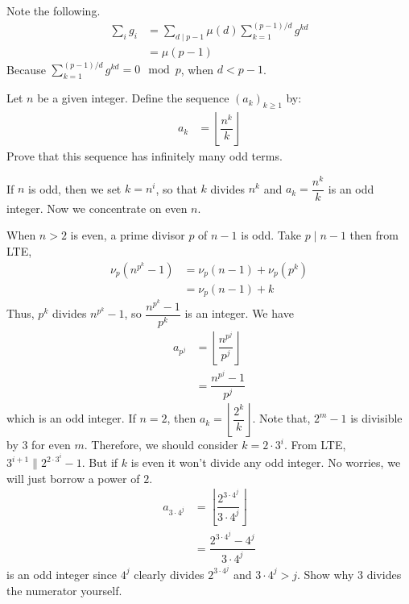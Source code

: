 \documentclass[problems.tex]{subfile}
\begin{document}
	\begin{solution}
		Note the following.
			\begin{align*}
				\sum_ig_i
					& =\sum_{d\mid p-1}\mu(d)\sum_{k=1}^{(p-1)/d}g^{kd}\\
					& =\mu(p-1)
			\end{align*}
		Because $\sum_{k=1}^{(p-1)/d}g^{kd}=0\mod p$, when $d<p-1$.
	\end{solution}

	\begin{problem}
		Let $n$ be a given integer. Define the sequence $(a_k)_{k\geq1}$ by:
			\begin{align*}
				a_k & = \left\lfloor\dfrac{n^k}{k}\right\rfloor
			\end{align*}
		Prove that this sequence has infinitely many odd terms.
	\end{problem}

	\begin{solution}
		If $n$ is odd, then we set $k=n^i$, so that $k$ divides $n^k$ and $a_k=\dfrac{n^k}{k}$ is an odd integer. Now we concentrate on even $n$.

		When $n>2$ is even, a prime divisor $p$ of $n-1$ is odd. Take $p\mid n-1$ then from LTE,
			\begin{align*}
				\nu_p\left(n^{p^k}-1\right) & = \nu_p(n-1)+\nu_p(p^k)\\
											& = \nu_p(n-1)+k
			\end{align*}
		Thus, $p^k$ divides $n^{p^k}-1$, so $\dfrac{n^{p^k}-1}{p^k}$ is an integer. We have
			\begin{align*}
				a_{p^j} & = \left\lfloor\dfrac{n^{p^j}}{p^j}\right\rfloor\\
						& = \dfrac{n^{p^j}-1}{p^j}
			\end{align*}
		which is an odd integer. If $n=2$, then $a_k=\left\lfloor\dfrac{2^k}{k}\right\rfloor$. Note that, $2^m-1$ is divisible by $3$ for even $m$. Therefore, we should consider $k=2\cdot3^i$. From LTE, $3^{i+1}\|2^{2\cdot3^i}-1$. But if $k$ is even it won't divide any odd integer. No worries, we will just borrow a power of $2$.
			\begin{align*}
				a_{3\cdot4^j} & = \left\lfloor\dfrac{2^{3\cdot4^j}}{3\cdot4^j}\right\rfloor\\
							  & = \dfrac{2^{3\cdot4^j}-4^j}{3\cdot4^j}
			\end{align*}
		is an odd integer since $4^j$ clearly divides $2^{3\cdot4^j}$ and $3\cdot4^j>j$. Show why $3$ divides the numerator yourself.
	\end{solution}
\end{document}

